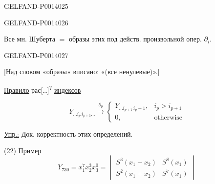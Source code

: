 \begin{GelfandAdjacentEvidence}{GELFAND-P001402}{5}

\end{GelfandAdjacentEvidence}
\begin{GelfandAdjacentEvidence}{GELFAND-P001402}{6}



Все мн. Шуберта \(=\)
образы этих под действ. произвольной опер. \(\partial_i\).

\end{GelfandAdjacentEvidence}
\begin{GelfandAdjacentEvidence}{GELFAND-P001402}{7}



[Над словом «образы» вписано: «(все ненулевые)».]

\uline{Правило}
рас[…]\textsuperscript{?}
\uline{индексов}

\end{GelfandAdjacentEvidence}



\begin{equation*}
Y_{\ldots i_p\,i_{p+1}\ldots}
\xrightarrow{\partial_p}
\begin{cases}
Y_{\ldots i_{p+1}\,i_p-1},&i_p>i_{p+1}\\
0,&\text{otherwise}
\end{cases} \tag{21}
\end{equation*}

\uline{Упр.:} Док. корректность этих определений.

(22) \uline{Пример}
\[
Y_{730}=x_1^7x_2^3x_3^0=
\begin{vmatrix}
S^3(x_1+x_2)&S^8(x_1)\\
S^2(x_1+x_2)&S^7(x_1)
\end{vmatrix}
\]


